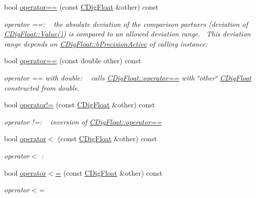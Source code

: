 \begin{DoxyCompactItemize}
bool \hyperlink{classCDigFloat_ad8980d984bf2bab71d15b830fd0180a5}{operator==} (const \hyperlink{classCDigFloat}{C\+Dig\+Float} \&other) const
\begin{DoxyCompactList}\small\item\em operator ==\+: ~\newline
 the absolute deviation of the comparison partners (deviation of \hyperlink{classCDigFloat_af74b8cd0935294b6371f551b7a1ff640}{C\+Dig\+Float\+::\+Value()}) is compared to an allowed deviation range.~\newline
 This deviation range depends on \hyperlink{classCDigFloat_aa1f6ed0312a2aa6ae5ee2abd195adefc}{C\+Dig\+Float\+::b\+Precision\+Active} of calling instance\+: \end{DoxyCompactList}\item 
bool \hyperlink{classCDigFloat_abb8746adc3bd94e002f7674eb6ab1165}{operator==} (const double other) const
\begin{DoxyCompactList}\small\item\em operator == with double\+: ~\newline
 calls \hyperlink{classCDigFloat_ad8980d984bf2bab71d15b830fd0180a5}{C\+Dig\+Float\+::operator==} with \char`\"{}other\char`\"{} \hyperlink{classCDigFloat}{C\+Dig\+Float} constructed from double. \end{DoxyCompactList}\item 
bool \hyperlink{classCDigFloat_a15c13c035aff8184491bd9629403a33a}{operator!=} (const \hyperlink{classCDigFloat}{C\+Dig\+Float} \&other) const
\begin{DoxyCompactList}\small\item\em operator !=\+: ~\newline
 inversion of \hyperlink{classCDigFloat_ad8980d984bf2bab71d15b830fd0180a5}{C\+Dig\+Float\+::operator==} \end{DoxyCompactList}\item 
bool \hyperlink{classCDigFloat_a159ef0b911dfba94ea468c36167c3a42}{operator$<$} (const \hyperlink{classCDigFloat}{C\+Dig\+Float} \&other) const
\begin{DoxyCompactList}\small\item\em operator$<$ \+: \end{DoxyCompactList}\item 
bool \hyperlink{classCDigFloat_a0c49ab029c7f0c610db1d29425353558}{operator$<$=} (const \hyperlink{classCDigFloat}{C\+Dig\+Float} \&other) const
\begin{DoxyCompactList}\small\item\em operator$<$= \end{DoxyCompactList}\item 

\end{DoxyCompactItemize}
